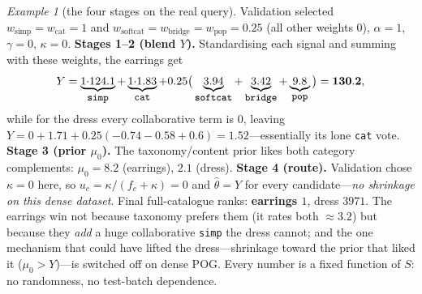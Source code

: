 \documentclass[11pt]{article}
\theoremstyle{remark}
\newtheorem{example}{Example}
\newcommand{\code}[1]{\texttt{\small #1}}
\begin{document}
\begin{example}[the four stages on the real query]
Validation selected $w_{\text{simp}}=w_{\text{cat}}=1$ and $w_{\text{softcat}}=w_{\text{bridge}}=w_{\text{pop}}=0.25$
(all other weights $0$), $\alpha=1$, $\gamma=0$, $\kappa=0$. \textbf{Stages 1--2 (blend $Y$).} Standardising each
signal and summing with these weights, the earrings get
\[
  Y=\underbrace{1{\cdot}124.1}_{\code{simp}}+\underbrace{1{\cdot}1.83}_{\code{cat}}
    +0.25\big(\underbrace{3.94}_{\code{softcat}}+\underbrace{3.42}_{\code{bridge}}+\underbrace{9.8}_{\code{pop}}\big)
    =\mathbf{130.2},
\]
while for the dress every collaborative term is $0$, leaving $Y=0+1.71+0.25(-0.74-0.58+0.6)=\mathbf{1.52}$---essentially
its lone \code{cat} vote. \textbf{Stage 3 (prior $\mu_0$).} The taxonomy/content prior likes both category
complements: $\mu_0=8.2$ (earrings), $2.1$ (dress). \textbf{Stage 4 (route).} Validation chose $\kappa=0$ here, so
$u_c=\kappa/(f_c+\kappa)=0$ and $\hat\theta=Y$ for every candidate---\emph{no shrinkage on this dense dataset}. Final
full-catalogue ranks: \textbf{earrings $1$}, dress $3971$. The earrings win not because taxonomy prefers them (it
rates both $\approx 3.2$) but because they \emph{add} a huge collaborative \code{simp} the dress cannot; and the one
mechanism that could have lifted the dress---shrinkage toward the prior that liked it ($\mu_0>Y$)---is switched off on
dense \textsc{POG}. Every number is a fixed function of $S$: no randomness, no test-batch dependence.
\end{example}
\end{document}
